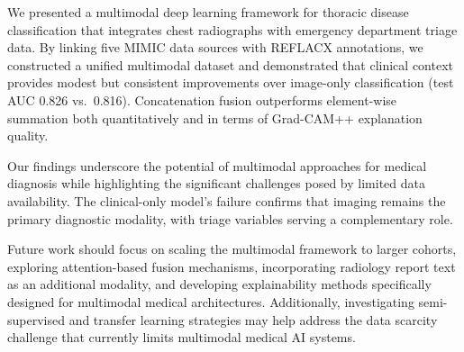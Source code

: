 \documentclass[conference]{IEEEtran}
\begin{document}
We presented a multimodal deep learning framework for thoracic disease classification that integrates chest radiographs with emergency department triage data. By linking five MIMIC data sources with REFLACX annotations, we constructed a unified multimodal dataset and demonstrated that clinical context provides modest but consistent improvements over image-only classification (test AUC 0.826 vs.\ 0.816). Concatenation fusion outperforms element-wise summation both quantitatively and in terms of Grad-CAM++ explanation quality.

Our findings underscore the potential of multimodal approaches for medical diagnosis while highlighting the significant challenges posed by limited data availability. The clinical-only model's failure confirms that imaging remains the primary diagnostic modality, with triage variables serving a complementary role.

Future work should focus on scaling the multimodal framework to larger cohorts, exploring attention-based fusion mechanisms, incorporating radiology report text as an additional modality, and developing explainability methods specifically designed for multimodal medical architectures. Additionally, investigating semi-supervised and transfer learning strategies may help address the data scarcity challenge that currently limits multimodal medical AI systems.



\end{document}
